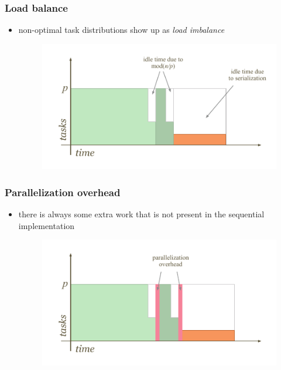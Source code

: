 \begin{frame}[fragile]
%
  \frametitle{Load balance}
%
  \begin{itemize}
%
  \item non-optimal task distributions show up as {\em load imbalance}
    \begin{figure}
      \centering
      \includegraphics[scale=1.0]{figures/reduction-load-imbalance.pdf}
    \end{figure}
%
  \end{itemize}
%
\end{frame}

\begin{frame}[fragile]
%
  \frametitle{Parallelization overhead}
%
  \begin{itemize}
%
  \item there is always some extra work that is not present in the sequential implementation
    \begin{figure}
      \centering
      \includegraphics[scale=1.0]{figures/reduction-overhead.pdf}
    \end{figure}
%
  \end{itemize}
%
\end{frame}

